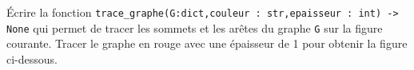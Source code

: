 \begin{question}
Écrire la fonction \lstinline{trace_graphe(G:dict,couleur : str,epaisseur : int) -> None} qui permet de tracer les sommets et les arêtes du graphe \lstinline{G} sur la figure courante. Tracer le graphe en rouge avec une épaisseur de 1 pour obtenir la figure ci-dessous.
\end{question}
